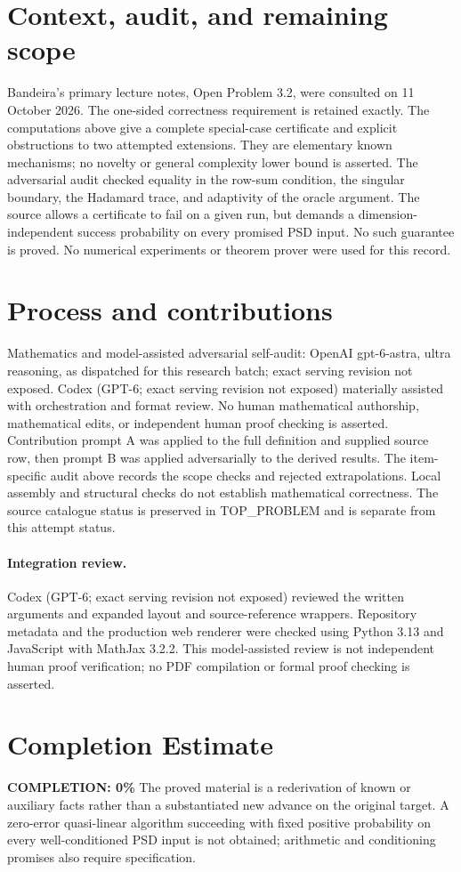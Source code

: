 \documentclass[11pt]{article}
\begin{document}
\section{Context, audit, and remaining scope}
Bandeira's primary lecture notes, Open Problem 3.2, were consulted on
11 October 2026. The one-sided correctness requirement is retained exactly.
The computations above give a complete special-case certificate and explicit
obstructions to two attempted extensions. They are elementary known mechanisms;
no novelty or general complexity lower bound is asserted.
The adversarial audit checked equality in the row-sum condition, the singular
boundary, the Hadamard trace, and adaptivity of the oracle argument. The source
allows a certificate to fail on a given run, but demands a dimension-independent
success probability on every promised PSD input. No such guarantee is proved.
No numerical experiments or theorem prover were used for this record.

\section{Process and contributions}
Mathematics and model-assisted adversarial self-audit: OpenAI gpt-6-astra, ultra reasoning, as dispatched for this research batch; exact serving revision not exposed. Codex (GPT-6; exact serving revision not exposed) materially assisted with orchestration and format review. No human mathematical authorship, mathematical edits, or independent human proof checking is asserted.
Contribution prompt A was applied to the full definition and supplied source row, then prompt B was applied adversarially to the derived results. The item-specific audit above records the scope checks and rejected extrapolations. Local assembly and structural checks do not establish mathematical correctness. The source catalogue status is preserved in TOP\_PROBLEM and is separate from this attempt status.
\paragraph{Integration review.} Codex (GPT-6; exact serving revision not exposed) reviewed the written arguments and expanded layout and source-reference wrappers. Repository metadata and the production web renderer were checked using Python 3.13 and JavaScript with MathJax 3.2.2. This model-assisted review is not independent human proof verification; no PDF compilation or formal proof checking is asserted.

\section{Completion Estimate}
\noindent\textbf{COMPLETION: 0\%}
The proved material is a rederivation of known or auxiliary facts rather than a substantiated new advance on the original target. A zero-error quasi-linear algorithm succeeding with fixed positive probability on every well-conditioned PSD input is not obtained; arithmetic and conditioning promises also require specification.
\end{document}
